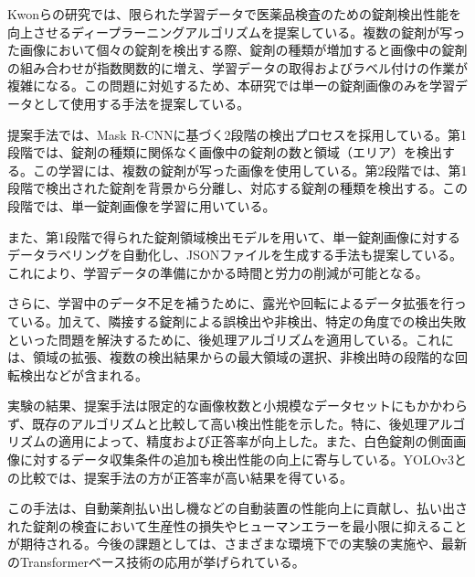 \documentclass[12pt]{article}
\begin{document}
Kwonらの研究では、\cite{chemosensors10010004}限られた学習データで医薬品検査のための錠剤検出性能を向上させるディープラーニングアルゴリズムを提案している。複数の錠剤が写った画像において個々の錠剤を検出する際、錠剤の種類が増加すると画像中の錠剤の組み合わせが指数関数的に増え、学習データの取得およびラベル付けの作業が複雑になる。この問題に対処するため、本研究では単一の錠剤画像のみを学習データとして使用する手法を提案している。

提案手法では、Mask R-CNNに基づく2段階の検出プロセスを採用している。第1段階では、錠剤の種類に関係なく画像中の錠剤の数と領域（エリア）を検出する。この学習には、複数の錠剤が写った画像を使用している。第2段階では、第1段階で検出された錠剤を背景から分離し、対応する錠剤の種類を検出する。この段階では、単一錠剤画像を学習に用いている。

また、第1段階で得られた錠剤領域検出モデルを用いて、単一錠剤画像に対するデータラベリングを自動化し、JSONファイルを生成する手法も提案している。これにより、学習データの準備にかかる時間と労力の削減が可能となる。

さらに、学習中のデータ不足を補うために、露光や回転によるデータ拡張を行っている。加えて、隣接する錠剤による誤検出や非検出、特定の角度での検出失敗といった問題を解決するために、後処理アルゴリズムを適用している。これには、領域の拡張、複数の検出結果からの最大領域の選択、非検出時の段階的な回転検出などが含まれる。

実験の結果、提案手法は限定的な画像枚数と小規模なデータセットにもかかわらず、既存のアルゴリズムと比較して高い検出性能を示した。特に、後処理アルゴリズムの適用によって、精度および正答率が向上した。また、白色錠剤の側面画像に対するデータ収集条件の追加も検出性能の向上に寄与している。YOLOv3との比較では、提案手法の方が正答率が高い結果を得ている。

この手法は、自動薬剤払い出し機などの自動装置の性能向上に貢献し、払い出された錠剤の検査において生産性の損失やヒューマンエラーを最小限に抑えることが期待される。今後の課題としては、さまざまな環境下での実験の実施や、最新のTransformerベース技術の応用が挙げられている。

\end{document}
